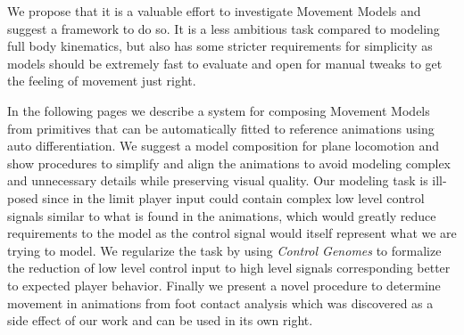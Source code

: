 We propose that it is a valuable effort to investigate Movement Models and suggest a framework to do so. It is a less ambitious task compared to modeling full body kinematics, but also has some stricter requirements for simplicity as models should be extremely fast to evaluate and open for manual tweaks to get the feeling of movement just right. 

In the following pages we describe a system for composing Movement Models from primitives that can be automatically fitted to reference animations using auto differentiation. We suggest a model composition for plane locomotion and show procedures to simplify and align the animations to avoid modeling complex and unnecessary details while preserving visual quality. Our modeling task is ill-posed since in the limit player input could contain complex low level control signals similar to what is found in the animations, which would greatly reduce requirements to the model as the control signal would itself represent what we are trying to model. We regularize the task by using \textit{Control Genomes} to formalize the reduction of low level control input to high level signals corresponding better to expected player behavior. Finally we present a novel procedure to determine movement in animations from foot contact analysis which was discovered as a side effect of our work and can be used in its own right.










